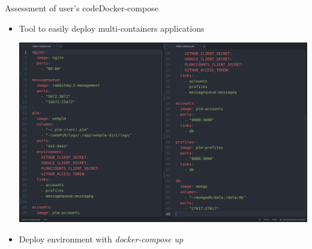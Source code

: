 \documentclass{beamer}
\begin{document}
\begin{frame}{Assessment of user's code}{Docker-compose}
  \begin{itemize}
  \item {
    Tool to easily deploy multi-containers applications
  }
  \begin{center}
    \includegraphics[scale=0.14]{img/docker-compose-2.png}
  \end{center}
  \item {
    Deploy environment with \emph{docker-compose up}
  }
  \end{itemize}
\end{frame}

{ %
  \begin{frame}[plain]
  \end{frame}
}
\end{document}
